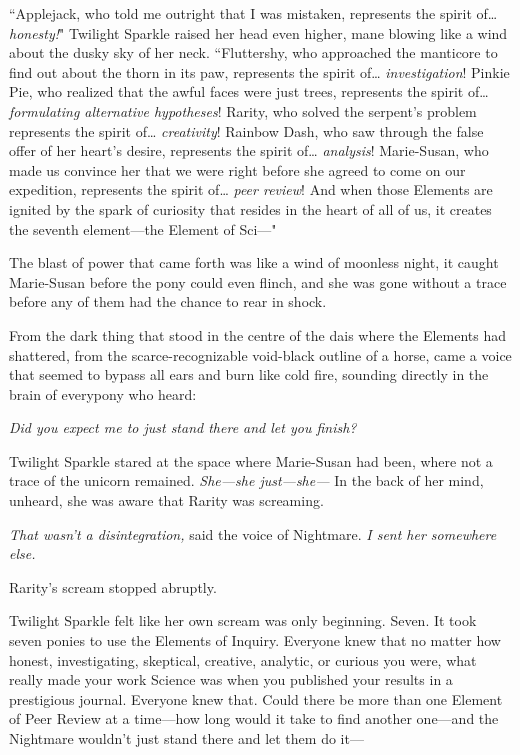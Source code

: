 
``Applejack, who told me outright that I was mistaken, represents the spirit of{\ldots} \emph{honesty!}" Twilight Sparkle raised her head even higher, mane blowing like a wind about the dusky sky of her neck. ``Fluttershy, who approached the manticore to find out about the thorn in its paw, represents the spirit of{\ldots} \emph{investigation}! Pinkie Pie, who realized that the awful faces were just trees, represents the spirit of{\ldots} \emph{formulating alternative hypotheses}! Rarity, who solved the serpent's problem represents the spirit of{\ldots} \emph{creativity}! Rainbow Dash, who saw through the false offer of her heart's desire, represents the spirit of{\ldots} \emph{analysis}! Marie-Susan, who made us convince her that we were right before she agreed to come on our expedition, represents the spirit of{\ldots} \emph{peer review}! And when those Elements are ignited by the spark of curiosity that resides in the heart of all of us, it creates the seventh element—the Element of Sci—"

The blast of power that came forth was like a wind of moonless night, it caught Marie-Susan before the pony could even flinch, and she was gone without a trace before any of them had the chance to rear in shock.

From the dark thing that stood in the centre of the dais where the Elements had shattered, from the scarce-recognizable void-black outline of a horse, came a voice that seemed to bypass all ears and burn like cold fire, sounding directly in the brain of everypony who heard:

\emph{Did you expect me to just stand there and let you finish?}

Twilight Sparkle stared at the space where Marie-Susan had been, where not a trace of the unicorn remained. \emph{She—she just—she—} In the back of her mind, unheard, she was aware that Rarity was screaming.

\emph{That wasn't a disintegration,} said the voice of Nightmare. \emph{I sent her somewhere else.}

Rarity's scream stopped abruptly.

Twilight Sparkle felt like her own scream was only beginning. Seven. It took seven ponies to use the Elements of Inquiry. Everyone knew that no matter how honest, investigating, skeptical, creative, analytic, or curious you were, what really made your work Science was when you published your results in a prestigious journal. Everyone knew that. Could there be more than one Element of Peer Review at a time—how long would it take to find another one—and the Nightmare wouldn't just stand there and let them do it—

